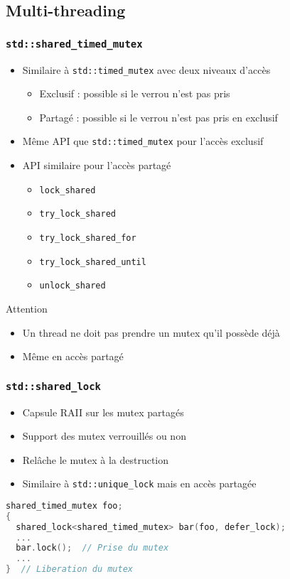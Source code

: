 \documentclass[C++.tex]{subfiles}
\begin{document}
\subsection*{Multi-threading}
\begin{frame}[fragile]
	\frametitle{\lstinline|std::shared_timed_mutex|}
	\begin{itemize}
		\item Similaire à \lstinline|std::timed_mutex| avec deux niveaux d'accès
		\begin{itemize}
			\item Exclusif : possible si le verrou n'est pas pris
			\item Partagé : possible si le verrou n'est pas pris en exclusif
		\end{itemize}
		\item Même API que \lstinline|std::timed_mutex| pour l'accès exclusif
		\item API similaire pour l'accès partagé
		\begin{itemize}
			\item \lstinline|lock_shared|
			\item \lstinline|try_lock_shared|
			\item \lstinline|try_lock_shared_for|
			\item \lstinline|try_lock_shared_until|
			\item \lstinline|unlock_shared|
		\end{itemize}
	\end{itemize}

	\begin{alertblock}{Attention}
		\begin{itemize}
			\item Un thread ne doit pas prendre un mutex qu'il possède déjà
			\item Même en accès partagé
		\end{itemize}
	\end{alertblock}
\end{frame}

\begin{frame}[fragile]
	\frametitle{\lstinline|std::shared_lock|}
	\begin{itemize}
		\item Capsule RAII sur les mutex partagés
		\item Support des mutex verrouillés ou non
		\item Relâche le mutex à la destruction
		\item Similaire à \lstinline|std::unique_lock| mais en accès partagée
	\end{itemize}

	\begin{lstlisting}[language=C++]
shared_timed_mutex foo;
{
  shared_lock<shared_timed_mutex> bar(foo, defer_lock);
  ...
  bar.lock();  // Prise du mutex
  ...
}  // Liberation du mutex\end{lstlisting}
\end{frame}
\end{document}
